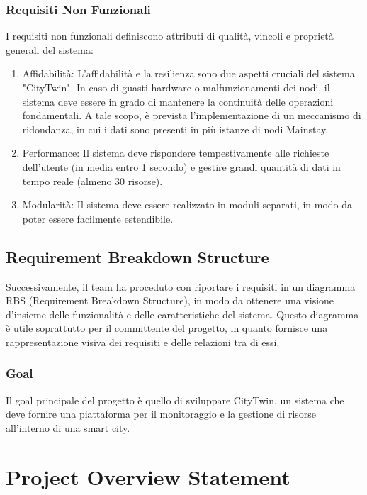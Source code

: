 \subsubsection{Requisiti Non Funzionali}
I requisiti non funzionali definiscono attributi di qualità, vincoli e proprietà generali del sistema:
\begin{enumerate}
    \item Affidabilità: L'affidabilità e la resilienza sono due aspetti cruciali del sistema "CityTwin". In caso di guasti hardware o malfunzionamenti dei nodi, il sistema deve essere in grado di mantenere la continuità delle operazioni fondamentali. A tale scopo, è prevista l'implementazione di un meccanismo di ridondanza, in cui i dati sono presenti in più istanze di nodi Mainstay.
    \item Performance: Il sistema deve rispondere tempestivamente alle richieste dell'utente (in media entro 1 secondo) e gestire grandi quantità di dati in tempo reale (almeno 30 risorse).
    \item Modularità: Il sistema deve essere realizzato in moduli separati, in modo da poter essere facilmente estendibile.
\end{enumerate}

\subsection{Requirement Breakdown Structure}

Successivamente, il team ha proceduto con riportare i requisiti in un diagramma RBS (Requirement Breakdown Structure), in modo da ottenere una visione d'insieme delle funzionalità e delle caratteristiche del sistema. Questo diagramma è utile soprattutto per il committente del progetto, in quanto fornisce una rappresentazione visiva dei requisiti e delle relazioni tra di essi.

\subsubsection{Goal}
Il goal principale del progetto è quello di sviluppare CityTwin, un sistema che deve fornire una piattaforma per il monitoraggio e la gestione di risorse all'interno di una smart city.



\section{Project Overview Statement}

